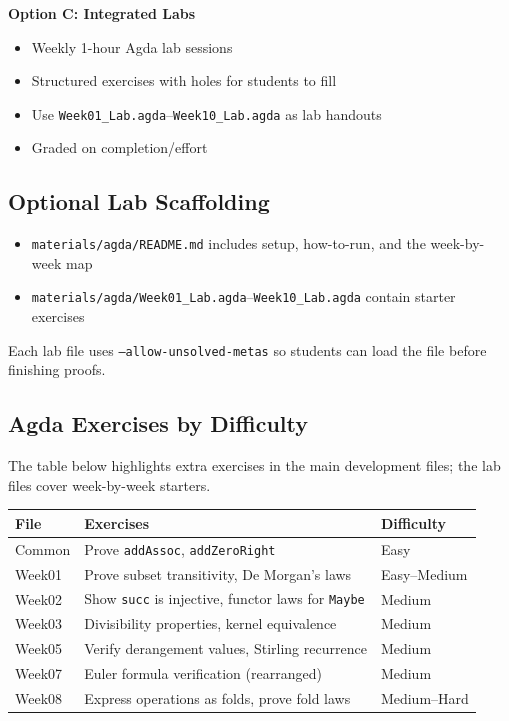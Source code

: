 \documentclass[11pt]{article}
\begin{document}
\textbf{Option C: Integrated Labs}
\begin{itemize}
    \item Weekly 1-hour Agda lab sessions
    \item Structured exercises with holes for students to fill
    \item Use \texttt{Week01\_Lab.agda}--\texttt{Week10\_Lab.agda} as lab handouts
    \item Graded on completion/effort
\end{itemize}

\subsection{Optional Lab Scaffolding}
\begin{itemize}
    \item \texttt{materials/agda/README.md} includes setup, how-to-run, and the week-by-week map
    \item \texttt{materials/agda/Week01\_Lab.agda}--\texttt{Week10\_Lab.agda} contain starter exercises
\end{itemize}
Each lab file uses \texttt{--allow-unsolved-metas} so students can load the file before finishing proofs.

\subsection{Agda Exercises by Difficulty}

The table below highlights extra exercises in the main development files; the lab files cover week-by-week starters.

\begin{center}
\begin{tabularx}{\textwidth}{lXl}
\toprule
\textbf{File} & \textbf{Exercises} & \textbf{Difficulty} \\
\midrule
Common & Prove \texttt{addAssoc}, \texttt{addZeroRight} & Easy \\
Week01 & Prove subset transitivity, De Morgan's laws & Easy--Medium \\
Week02 & Show \texttt{succ} is injective, functor laws for \texttt{Maybe} & Medium \\
Week03 & Divisibility properties, kernel equivalence & Medium \\
Week05 & Verify derangement values, Stirling recurrence & Medium \\
Week07 & Euler formula verification (rearranged) & Medium \\
Week08 & Express operations as folds, prove fold laws & Medium--Hard \\
\bottomrule
\end{tabularx}
\end{center}
\end{document}
